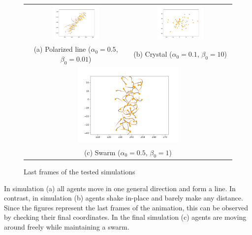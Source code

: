 \documentclass[9pt]{pnas-new}
\begin{document}
\begin{figure}[H]
    \centering
    \begin{tabular}{cc}
        \includegraphics[width=0.47\textwidth]{line.png} &
        \includegraphics[width=0.47\textwidth]{crystal.png} \\
        (a) Polarized line ($\alpha_0 = 0.5$, $\beta_0 = 0.01$) & (b) Crystal ($\alpha_0 = 0.1$, $\beta_0 = 10$) \\
        \multicolumn{2}{c}{
            \includegraphics[width=0.5\textwidth]{swarm.png}
        } \\
        \multicolumn{2}{c}{(c) Swarm ($\alpha_0 = 0.5$, $\beta_0 = 1$)}
    \end{tabular}
    \caption{Last frames of the tested simulations}
    \label{fig:simulation}
\end{figure}

In simulation (a) all agents move in one general direction and form a line.
In contrast, in simulation (b) agents shake in-place and barely make any distance.
Since the figures represent the last frames of the animation, this can be observed by checking their final coordinates.
In the final simulation (c) agents are moving around freely while maintaining a swarm.
\end{document}
